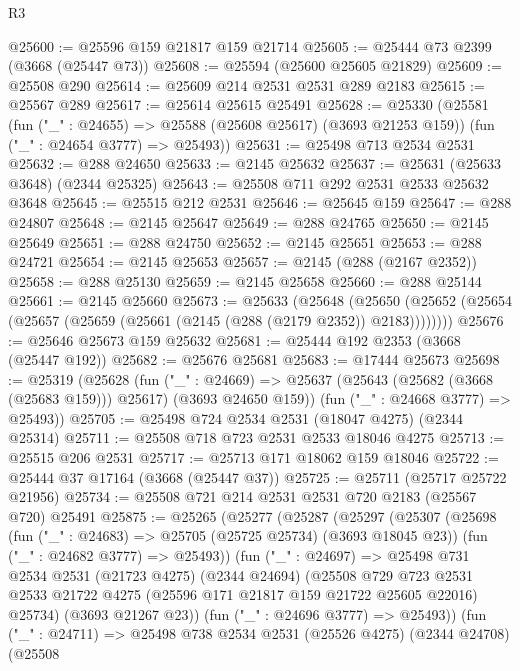 \begin{lexlean}{R3}
\begin{coremodule}
@25600 := @25596 @159 @21817 @159 @21714
@25605 := @25444 @73 @2399 (@3668 (@25447 @73))
@25608 := @25594 (@25600 @25605 @21829)
@25609 := @25508 @290
@25614 := @25609 @214 @2531 @2531 @289 @2183
@25615 := @25567 @289
@25617 := @25614 @25615 @25491
@25628 := @25330
    (@25581
      (fun ("_" : @24655) => @25588 (@25608 @25617) (@3693 @21253 @159))
      (fun ("_" : @24654 @3777) => @25493))
@25631 := @25498 @713 @2534 @2531
@25632 := @288 @24650
@25633 := @2145 @25632
@25637 := @25631 (@25633 @3648) (@2344 @25325)
@25643 := @25508 @711 @292 @2531 @2533 @25632 @3648
@25645 := @25515 @212 @2531
@25646 := @25645 @159
@25647 := @288 @24807
@25648 := @2145 @25647
@25649 := @288 @24765
@25650 := @2145 @25649
@25651 := @288 @24750
@25652 := @2145 @25651
@25653 := @288 @24721
@25654 := @2145 @25653
@25657 := @2145 (@288 (@2167 @2352))
@25658 := @288 @25130
@25659 := @2145 @25658
@25660 := @288 @25144
@25661 := @2145 @25660
@25673 := @25633
    (@25648
      (@25650 (@25652 (@25654 (@25657 (@25659 (@25661 (@2145 (@288 (@2179 @2352)) @2183))))))))
@25676 := @25646 @25673 @159 @25632
@25681 := @25444 @192 @2353 (@3668 (@25447 @192))
@25682 := @25676 @25681
@25683 := @17444 @25673
@25698 := @25319
    (@25628
      (fun ("_" : @24669) =>
      @25637 (@25643 (@25682 (@3668 (@25683 @159))) @25617) (@3693 @24650 @159))
      (fun ("_" : @24668 @3777) => @25493))
@25705 := @25498 @724 @2534 @2531 (@18047 @4275) (@2344 @25314)
@25711 := @25508 @718 @723 @2531 @2533 @18046 @4275
@25713 := @25515 @206 @2531
@25717 := @25713 @171 @18062 @159 @18046
@25722 := @25444 @37 @17164 (@3668 (@25447 @37))
@25725 := @25711 (@25717 @25722 @21956)
@25734 := @25508 @721 @214 @2531 @2531 @720 @2183 (@25567 @720) @25491
@25875 := @25265
    (@25277
      (@25287
        (@25297
          (@25307
            (@25698
              (fun ("_" : @24683) => @25705 (@25725 @25734) (@3693 @18045 @23))
              (fun ("_" : @24682 @3777) => @25493))
            (fun ("_" : @24697) =>
            @25498
              @731
              @2534
              @2531
              (@21723 @4275)
              (@2344 @24694)
              (@25508
                @729
                @723
                @2531
                @2533
                @21722
                @4275
                (@25596 @171 @21817 @159 @21722 @25605 @22016)
                @25734)
              (@3693 @21267 @23))
            (fun ("_" : @24696 @3777) => @25493))
          (fun ("_" : @24711) =>
          @25498
            @738
            @2534
            @2531
            (@25526 @4275)
            (@2344 @24708)
            (@25508

\end{coremodule}
\end{lexlean}
